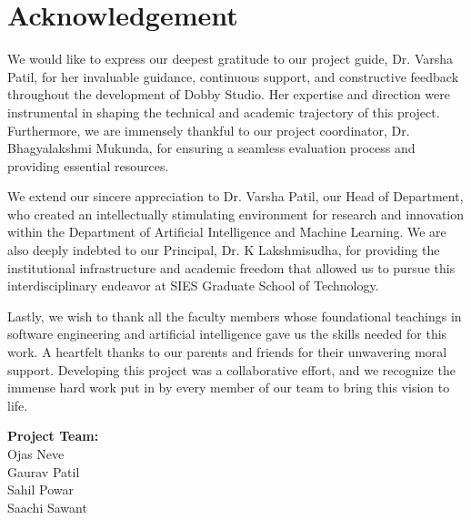 \chapter*{Acknowledgement}

We would like to express our deepest gratitude to our project guide, Dr. Varsha Patil, for her invaluable guidance, continuous support, and constructive feedback throughout the development of Dobby Studio. Her expertise and direction were instrumental in shaping the technical and academic trajectory of this project. Furthermore, we are immensely thankful to our project coordinator, Dr. Bhagyalakshmi Mukunda, for ensuring a seamless evaluation process and providing essential resources.

We extend our sincere appreciation to Dr. Varsha Patil, our Head of Department, who created an intellectually stimulating environment for research and innovation within the Department of Artificial Intelligence and Machine Learning. We are also deeply indebted to our Principal, Dr. K Lakshmisudha, for providing the institutional infrastructure and academic freedom that allowed us to pursue this interdisciplinary endeavor at SIES Graduate School of Technology.

Lastly, we wish to thank all the faculty members whose foundational teachings in software engineering and artificial intelligence gave us the skills needed for this work. A heartfelt thanks to our parents and friends for their unwavering moral support. Developing this project was a collaborative effort, and we recognize the immense hard work put in by every member of our team to bring this vision to life.

\vspace{2cm}

\begin{flushright}
\textbf{Project Team:}\\
Ojas Neve\\
Gaurav Patil\\
Sahil Powar\\
Saachi Sawant
\end{flushright}
